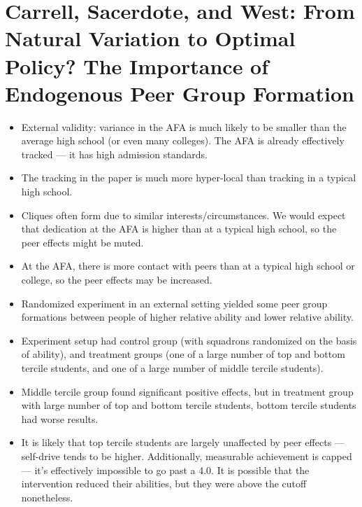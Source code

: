 \documentclass[10pt]{extarticle}
\begin{document}
  \section{Carrell, Sacerdote, and West: From Natural Variation to Optimal Policy? The Importance of Endogenous Peer Group Formation}%
  \begin{itemize}
    \item External validity: variance in the AFA is much likely to be smaller than the average high school (or even many colleges). The AFA is already effectively tracked --- it has high admission standards.
    \item The tracking in the paper is much more hyper-local than tracking in a typical high school.
    \item Cliques often form due to similar interests/circumstances. We would expect that dedication at the AFA is higher than at a typical high school, so the peer effects might be muted.
    \item At the AFA, there is more contact with peers than at a typical high school or college, so the peer effects may be increased.
    \item Randomized experiment in an external setting yielded some peer group formations between people of higher relative ability and lower relative ability.
    \item Experiment setup had control group (with squadrons randomized on the basis of ability), and treatment groups (one of a large number of top and bottom tercile students, and one of a large number of middle tercile students).
    \item Middle tercile group found significant positive effects, but in treatment group with large number of top and bottom tercile students, bottom tercile students had worse results.
    \item It is likely that top tercile students are largely unaffected by peer effects --- self-drive tends to be higher. Additionally, measurable achievement is capped --- it's effectively impossible to go past a 4.0. It is possible that the intervention reduced their abilities, but they were above the cutoff nonetheless.
  \end{itemize}
\end{document}
